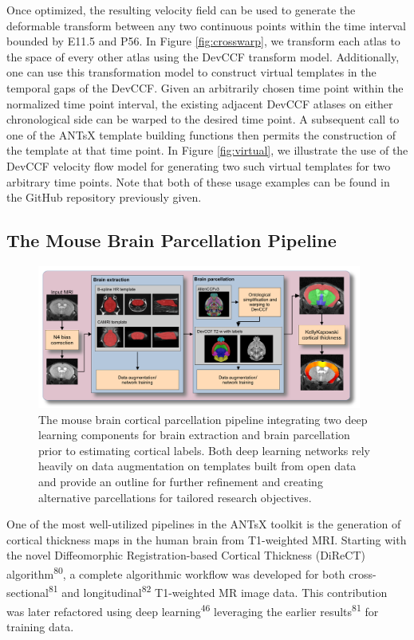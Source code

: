\documentclass[
  12pt,
]{article}
\begin{document}
Once optimized, the resulting velocity field can be used to generate the
deformable transform between any two continuous points within the time
interval bounded by E11.5 and P56. In Figure \ref{fig:crosswarp}, we
transform each atlas to the space of every other atlas using the DevCCF
transform model. Additionally, one can use this transformation model to
construct virtual templates in the temporal gaps of the DevCCF. Given an
arbitrarily chosen time point within the normalized time point interval,
the existing adjacent DevCCF atlases on either chronological side can be
warped to the desired time point. A subsequent call to one of the ANTsX
template building functions then permits the construction of the
template at that time point. In Figure \ref{fig:virtual}, we illustrate
the use of the DevCCF velocity flow model for generating two such
virtual templates for two arbitrary time points. Note that both of these
usage examples can be found in the GitHub repository previously given.

\subsection{The Mouse Brain Parcellation
Pipeline}\label{the-mouse-brain-parcellation-pipeline}

\begin{figure}
\centering
\includegraphics[width=0.95\textwidth]{Figures/mousePipeline.pdf}
\caption{The mouse brain cortical parcellation pipeline integrating two 
deep learning components for brain extraction and brain parcellation 
prior to estimating cortical labels. Both deep learning networks
rely heavily on data augmentation on templates built from open 
data and provide an outline for further refinement and creating 
alternative parcellations for tailored research objectives.}
\label{fig:mouseKK}
\end{figure}

One of the most well-utilized pipelines in the ANTsX toolkit is the
generation of cortical thickness maps in the human brain from
T1-weighted MRI. Starting with the novel Diffeomorphic
Registration-based Cortical Thickness (DiReCT)
algorithm\textsuperscript{80}, a complete algorithmic workflow was
developed for both cross-sectional\textsuperscript{81} and
longitudinal\textsuperscript{82} T1-weighted MR image data. This
contribution was later refactored using deep
learning\textsuperscript{46} leveraging the earlier
results\textsuperscript{81} for training data.
\end{document}
